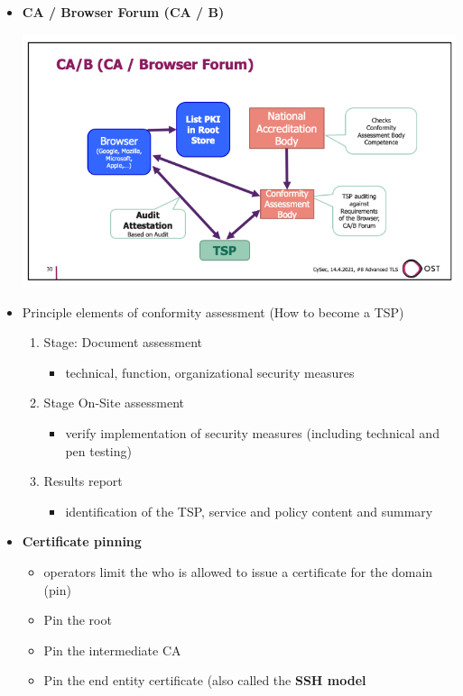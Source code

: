 \documentclass[11pt,twoside,landscape]{article}
\begin{document}
\begin{multicols}{4}
\begin{itemize}
\item \textbf{CA / Browser Forum (CA / B)}
\begin{center}
\includegraphics[width=.9\linewidth]{img/ca_b.png}
\end{center}

\item Principle elements of conformity assessment (How to become a TSP)
\begin{enumerate}
\item Stage: Document assessment
\begin{itemize}
\item technical, function, organizational security measures
\end{itemize}
\item Stage On-Site assessment
\begin{itemize}
\item verify implementation of security measures (including technical and pen testing)
\end{itemize}
\item Results report
\begin{itemize}
\item identification of the TSP, service and policy content and summary
\end{itemize}
\end{enumerate}
\end{itemize}


\begin{itemize}
\item \textbf{Certificate pinning}
\begin{itemize}
\item operators limit the who is allowed to issue a certificate for the domain (pin)
\item Pin the root
\item Pin the intermediate CA
\item Pin the end entity certificate (also called the \textbf{SSH model}
\end{itemize}
\end{itemize}


\end{multicols}
\end{document}
